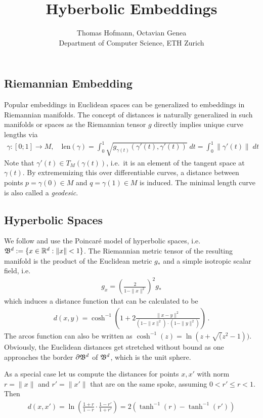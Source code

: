 \documentclass{article}
\title{Hyberbolic Embeddings}
\author{Thomas Hofmann, Octavian Genea\\[2mm] Department of Computer Science, ETH Zurich}
\renewcommand{\Re}{{\mathbb R}}
\begin{document}
\maketitle

\subsection*{Riemannian  Embedding} 

Popular embeddings in Euclidean spaces can be generalized to embeddings in Riemannian manifolds. The concept of distances is naturally generalized in such manifolds or spaces as the Riemannian tensor $g$ directly implies unique curve lengths via
\begin{align}
\gamma: [0;1] \to M, \quad \text{len}(\gamma) = \int_{0}^1 \sqrt{g_{\gamma(t)}(\gamma'(t), \gamma'(t))}  \; dt = \int_0^1 \| \gamma'(t) \| \; dt 
\end{align}
Note that $\gamma'(t) \in T_M(\gamma(t))$, i.e.~it is an element of the tangent space at $\gamma(t)$. By extrememizing this over differentiable curves, a distance between points $p = \gamma(0) \in M$ and $q = \gamma(1) \in M$ is induced. The minimal length curve is also called a \textit{geodesic}. 

\subsection*{Hyperbolic Spaces}

We follow \cite{nickel2017poincar} and use the Poincar\'e model of hyperbolic spaces, i.e.~$\frak B^d := \{ x \in \Re^d: \| x\| <1\}$. The Riemannian metric tensor of the resulting manifold is the product of the Euclidean metric $g_*$ and a simple isotropic scalar field, i.e.
\begin{align}
g_x = \left( \frac{2}{1-\|x\|^2} \right)^2 g_*
\end{align}
which induces a distance function that can be calculated to be 
\begin{align}
d(x,y) = \cosh^{-1}\left(1+ 2 \frac{\| x-y\|^2}{(1-\|x\|^2) \cdot (1-\|y\|^2)} \right) \,.
\end{align}
The arcos function can also be written as $\cosh^{-1}(z) = \ln(z + \sqrt(z^2-1))$. 
Obviously, the Euclidean distances get stretched without bound as one approaches the border $\partial \frak B^d$ of $\frak B^d$, which is the unit sphere. 

As a special case let us compute the distances for points $x,x'$ with norm $r=\|x\|$ and $r'=\|x'\|$ that are on the same spoke, assuming $0 < r' \le r < 1$. Then 
\begin{align}
d(x,x') = \ln \left( \frac{1+r}{1-r} \cdot \frac{1-r'}{1+r'} \right) = 2 \left( \tanh^{-1}(r) - \tanh^{-1}(r') \right)
\end{align}
\end{document}
